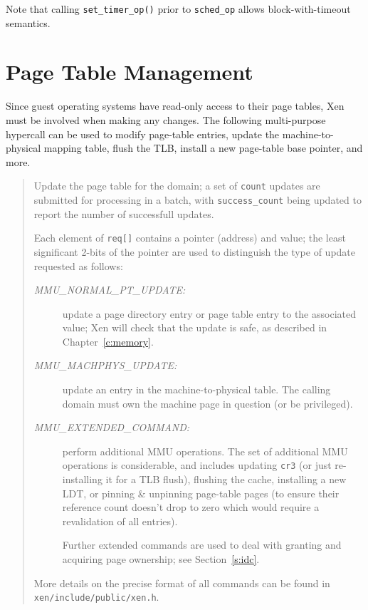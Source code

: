 \documentclass[11pt,twoside,final,openright]{xenstyle}
\begin{document}
Note that calling {\tt set\_timer\_op()} prior to {\tt sched\_op} 
allows block-with-timeout semantics. 


\section{Page Table Management} 

Since guest operating systems have read-only access to their page 
tables, Xen must be involved when making any changes. The following
multi-purpose hypercall can be used to modify page-table entries, 
update the machine-to-physical mapping table, flush the TLB, install 
a new page-table base pointer, and more.

\begin{quote} 

Update the page table for the domain; a set of {\tt count} updates are
submitted for processing in a batch, with {\tt success\_count} being 
updated to report the number of successfull updates.  

Each element of {\tt req[]} contains a pointer (address) and value; 
the least significant 2-bits of the pointer are used to distinguish 
the type of update requested as follows:
\begin{description} 

\item[\it MMU\_NORMAL\_PT\_UPDATE:] update a page directory entry or
page table entry to the associated value; Xen will check that the
update is safe, as described in Chapter~\ref{c:memory}.

\item[\it MMU\_MACHPHYS\_UPDATE:] update an entry in the
  machine-to-physical table. The calling domain must own the machine
  page in question (or be privileged).

\item[\it MMU\_EXTENDED\_COMMAND:] perform additional MMU operations.
The set of additional MMU operations is considerable, and includes
updating {\tt cr3} (or just re-installing it for a TLB flush),
flushing the cache, installing a new LDT, or pinning \& unpinning
page-table pages (to ensure their reference count doesn't drop to zero
which would require a revalidation of all entries).

Further extended commands are used to deal with granting and 
acquiring page ownership; see Section~\ref{s:idc}. 


\end{description}

More details on the precise format of all commands can be 
found in {\tt xen/include/public/xen.h}. 


\end{quote}
\end{document}
